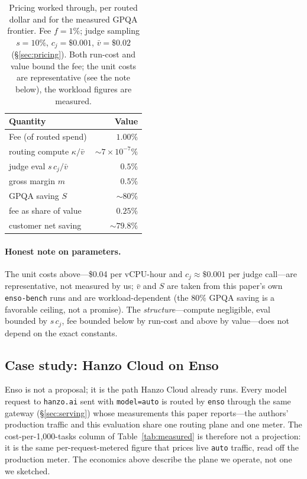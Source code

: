 \documentclass[11pt]{article}
\begin{document}
\begin{table}[t]
\centering
\small
\setlength{\tabcolsep}{6pt}
\caption{Pricing worked through, per routed dollar and for the measured
GPQA frontier. Fee $f=1\%$; judge sampling $s=10\%$, $c_j=\$0.001$,
$\bar v=\$0.02$ (\S\ref{sec:pricing}). Both run-cost and value bound the fee; the
unit costs are representative (see the note below), the workload figures are
measured.}
\label{tab:econ}
\begin{tabular}{@{}lr@{}}
\toprule
Quantity & Value \\
\midrule
Fee (of routed spend)                 & $1.00\%$ \\
\quad routing compute $\kappa/\bar v$ & ${\sim}7\times10^{-7}\%$ \\
\quad judge eval $s\,c_j/\bar v$      & $0.5\%$ \\
\quad gross margin $m$                & $0.5\%$ \\
\midrule
GPQA saving $S$                       & ${\sim}80\%$ \\
\quad fee as share of value           & $0.25\%$ \\
\quad customer net saving             & ${\sim}79.8\%$ \\
\bottomrule
\end{tabular}
\end{table}

\paragraph{Honest note on parameters.} The unit costs above---\$0.04 per vCPU-hour
and $c_j\approx\$0.001$ per judge call---are representative, not measured by us;
$\bar v$ and $S$ are taken from this paper's own \texttt{enso-bench} runs and are
workload-dependent (the $80\%$ GPQA saving is a favorable ceiling, not a
promise). The \emph{structure}---compute negligible, eval bounded by $s\,c_j$, fee
bounded below by run-cost and above by value---does not depend on the exact
constants.

\subsection{Case study: Hanzo Cloud on Enso}
\label{sec:casestudy}

Enso is not a proposal; it is the path Hanzo Cloud already runs. Every model request
to \texttt{hanzo.ai} sent with \texttt{model=auto} is routed by \texttt{enso} through
the same gateway (\S\ref{sec:serving}) whose measurements this paper reports---the
authors' production traffic and this evaluation share one routing plane and one
meter. The cost-per-1{,}000-tasks column of Table~\ref{tab:measured} is therefore not a
projection: it is the same per-request-metered figure that prices live \texttt{auto}
traffic, read off the production meter. The economics above describe the plane we
operate, not one we sketched.
\end{document}
